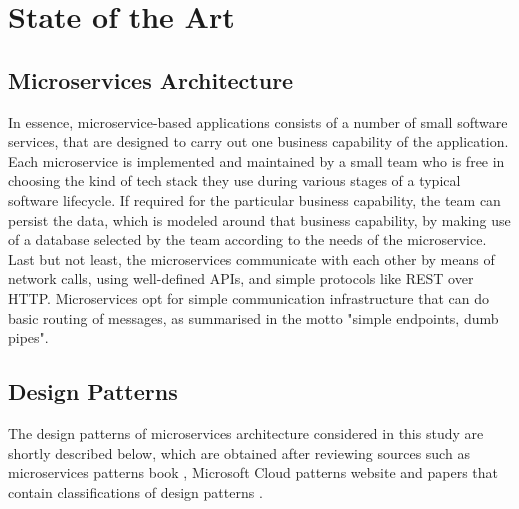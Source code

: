 \documentclass[11pt,a4paper,twocolumn]{article}
\begin{document}

\section{State of the Art}
\label{sec:State of the Art}


\subsection{Microservices Architecture}
\label{subsec:microservice}

In essence, microservice-based applications consists of a number of small software services, that are designed to carry out one business capability of the application.
Each microservice is implemented and maintained by a small team who is free in choosing the kind of tech stack they use during various stages of a typical software lifecycle.
If required for the particular business capability, the team can persist the data, which is modeled around that business capability, by making use of a database selected by the team according to the needs of the microservice.
Last but not least, the microservices communicate with each other by means of network calls, using well-defined APIs, and simple protocols like REST over HTTP.
Microservices opt for simple communication infrastructure that can do basic routing of messages, as summarised in the motto "simple endpoints, dumb pipes".

\subsection{Design Patterns}
\label{subsec:patterns}

The design patterns of microservices architecture considered in this study are shortly described below, which are obtained after reviewing sources such as microservices patterns book \cite{richardson_book}, Microsoft Cloud patterns website \cite{microsoft_docs} and papers that contain classifications of design patterns \cite{TaibiD2018APfM}\cite{KARABEYAKSAKALLI2021111014}\cite{valdivia}\cite{10.1145/3241403.3241429}\cite{8719492}\cite{9105640}.
\end{document}
